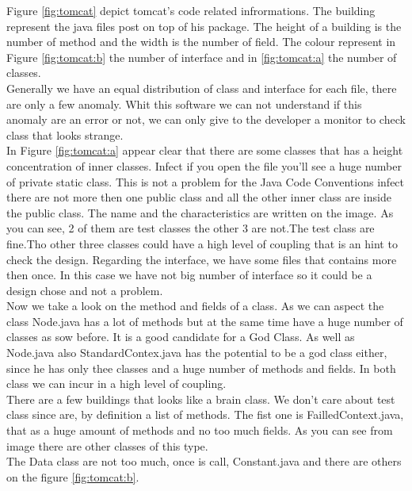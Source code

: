 \documentclass[]{usiinfbachelorproject}
\begin{document}
Figure \ref{fig:tomcat} depict tomcat's code related infrormations. The building represent the java files post on top of his package. The height of a building is the number of method and the width is the number of field. The colour represent in Figure \ref{fig:tomcat:b} the number of interface and in \ref{fig:tomcat:a} the number of classes.\\ 
Generally we have an equal distribution of class and interface for each file, there are only a few anomaly. Whit this software we can not understand if this anomaly are an error or not, we can only give to the developer a monitor to check class that looks strange.\\
In Figure \ref{fig:tomcat:a} appear clear that there are some classes that has a height concentration of inner classes. Infect if you open the file you'll see a huge number of private static class. This is not a problem for the Java Code Conventions  \cite{oracle} infect there are not more then one public class and all the other inner class are inside the public class. The name and the characteristics are written on the image. As you can see, 2 of them are test classes the other 3 are not.The test class are fine.Tho other three classes could have a high level of coupling that is an hint to check the design.
Regarding the interface, we  have some  files that contains more then once. In this case we have not big number of interface so it could be a design  chose and not a problem.\\
Now we take a look on the method and fields of a class. As we can aspect the class Node.java has a lot of methods but at the same time have a huge number of classes as sow before.
It is a good candidate for a God Class. As well as Node.java also StandardContex.java has the potential to be a god class either,  since he has only thee classes and a huge number of methods and fields. In both class we can incur in a high level of coupling.\\
There are a few buildings that looks like a brain class. We don't care about test class since are, by definition a list of methods. The fist one is FailledContext.java, that as a huge amount of methods and no too much fields. As you can see from image there are other classes of this type.\\
The Data class are not too much, once is call,  Constant.java and there are others on the figure \ref{fig:tomcat:b}.
\end{document}
